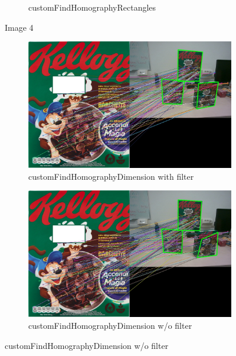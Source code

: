 \documentclass{article}
\begin{document}
\begin{figure}[H]
\begin{subfigure}[b]{0.3\textwidth}
         \caption{customFindHomographyRectangles}
         \label{fig:customFindHomographyRectangles}
     \end{subfigure}
     \hfill
        \caption{Image 4}
        \label{fig:image 4}
\end{figure}

\begin{figure}[H]
     \centering
     \begin{subfigure}[b]{0.3\textwidth}
         \centering
         \includegraphics[width=\textwidth]{image/barchette_5_con_filtro.jpg}
         \caption{customFindHomographyDimension with filter}
         \label{fig:customFindHomographyDimension with filter}
     \end{subfigure}
     \hfill
     \begin{subfigure}[b]{0.3\textwidth}
         \centering
         \includegraphics[width=\textwidth]{image/barchette_5_senza_filtro.jpg}
         \caption{customFindHomographyDimension w/o filter}
         \label{fig:customFindHomographyDimension without filter}

\end{subfigure}
\end{figure}
\end{document}
